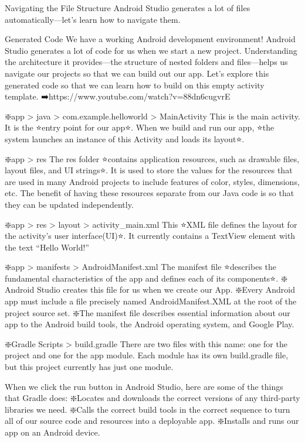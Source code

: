 Navigating the File Structure
        Android Studio generates a lot of files automatically—let's learn how to navigate them.
    
Generated Code
        We have a working Android development environment! Android Studio generates a lot of code for us when we start a new project. Understanding the architecture it provides—the structure of nested folders and files—helps us navigate our projects so that we can build out our app. Let’s explore this generated code so that we can learn how to build on this empty activity template.
            ➡️https://www.youtube.com/watch?v=88dn6cugvrE
    
        ❇️app > java > com.example.helloworld > MainActivity
            This is the main activity. It is the ⭐entry point for our app⭐. When we build and run our app, ⭐the system launches an instance of this Activity and loads its layout⭐.

        ❇️app > res
            The res folder ⭐contains application resources, such as drawable files, layout files, and UI strings⭐. It is used to store the values for the resources that are used in many Android projects to include features of color, styles, dimensions, etc. The benefit of having these resources separate from our Java code is so that they can be updated independently.

        ❇️app > res > layout > activity_main.xml
            This ⭐XML file defines the layout for the activity’s user interface(UI)⭐. It currently contains a TextView element with the text “Hello World!”

        ❇️app > manifests > AndroidManifest.xml
            The manifest file ⭐describes the fundamental characteristics of the app and defines each of its components⭐.
                ❇️ Android Studio creates this file for us when we create our App.
                ❇️Every Android app must include a file precisely named AndroidManifest.XML at the root of the project source set.
                ❇️The manifest file describes essential information about our app to the Android build tools, the Android operating system, and Google Play.

        ❇️Gradle Scripts > build.gradle
            There are two files with this name: one for the project and one for the app module. Each module has its own build.gradle file, but this project currently has just one module.

            When we click the run button in Android Studio, here are some of the things that Gradle does:
                ❇️Locates and downloads the correct versions of any third-party libraries we need.
                ❇️Calls the correct build tools in the correct sequence to turn all of our source code and resources into a deployable app.
                ❇️Installs and runs our app on an Android device.
        
